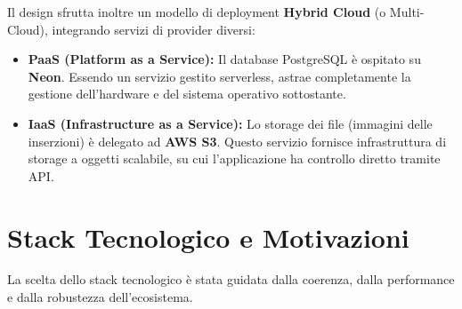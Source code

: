 Il design sfrutta inoltre un modello di deployment \textbf{Hybrid Cloud} (o Multi-Cloud), integrando servizi di provider diversi:
\begin{itemize}
    \item \textbf{PaaS (Platform as a Service):} Il database PostgreSQL è ospitato su \textbf{Neon}. Essendo un servizio gestito serverless, astrae completamente la gestione dell'hardware e del sistema operativo sottostante.
    \item \textbf{IaaS (Infrastructure as a Service):} Lo storage dei file (immagini delle inserzioni) è delegato ad \textbf{AWS S3}. Questo servizio fornisce infrastruttura di storage a oggetti scalabile, su cui l'applicazione ha controllo diretto tramite API.
\end{itemize}

\section{Stack Tecnologico e Motivazioni}
La scelta dello stack tecnologico è stata guidata dalla coerenza, dalla performance e dalla robustezza dell'ecosistema.

